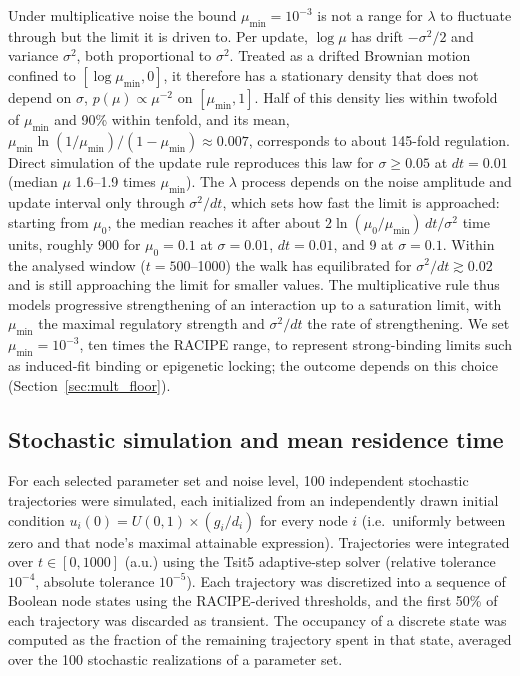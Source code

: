 \documentclass[11pt]{article}
\begin{document}
Under multiplicative noise the bound $\mu_{\min} = 10^{-3}$ is not a range for $\lambda$ to fluctuate through but the limit it is driven to. Per update, $\log\mu$ has drift $-\sigma^2/2$ and variance $\sigma^2$, both proportional to $\sigma^2$. Treated as a drifted Brownian motion confined to $[\log\mu_{\min}, 0]$, it therefore has a stationary density that does not depend on $\sigma$, $p(\mu) \propto \mu^{-2}$ on $[\mu_{\min}, 1]$. Half of this density lies within twofold of $\mu_{\min}$ and 90\% within tenfold, and its mean, $\mu_{\min}\ln(1/\mu_{\min})/(1-\mu_{\min}) \approx 0.007$, corresponds to about 145-fold regulation. Direct simulation of the update rule reproduces this law for $\sigma \geq 0.05$ at $dt = 0.01$ (median $\mu$ 1.6--1.9 times $\mu_{\min}$). The $\lambda$ process depends on the noise amplitude and update interval only through $\sigma^2/dt$, which sets how fast the limit is approached: starting from $\mu_0$, the median reaches it after about $2\ln(\mu_0/\mu_{\min})\,dt/\sigma^2$ time units, roughly 900 for $\mu_0 = 0.1$ at $\sigma = 0.01$, $dt = 0.01$, and 9 at $\sigma = 0.1$. Within the analysed window ($t = 500$--1000) the walk has equilibrated for $\sigma^2/dt \gtrsim 0.02$ and is still approaching the limit for smaller values. The multiplicative rule thus models progressive strengthening of an interaction up to a saturation limit, with $\mu_{\min}$ the maximal regulatory strength and $\sigma^2/dt$ the rate of strengthening. We set $\mu_{\min} = 10^{-3}$, ten times the RACIPE range, to represent strong-binding limits such as induced-fit binding or epigenetic locking; the outcome depends on this choice (Section~\ref{sec:mult_floor}).

\subsection{Stochastic simulation and mean residence time}

For each selected parameter set and noise level, 100 independent stochastic trajectories were simulated, each initialized from an independently drawn initial condition $u_i(0) = U(0,1) \times (g_i/d_i)$ for every node $i$ (i.e.\ uniformly between zero and that node's maximal attainable expression). Trajectories were integrated over $t \in [0, 1000]$ (a.u.) using the Tsit5 adaptive-step solver (relative tolerance $10^{-4}$, absolute tolerance $10^{-5}$). Each trajectory was discretized into a sequence of Boolean node states using the RACIPE-derived thresholds, and the first 50\% of each trajectory was discarded as transient. The occupancy of a discrete state was computed as the fraction of the remaining trajectory spent in that state, averaged over the 100 stochastic realizations of a parameter set.
\end{document}
